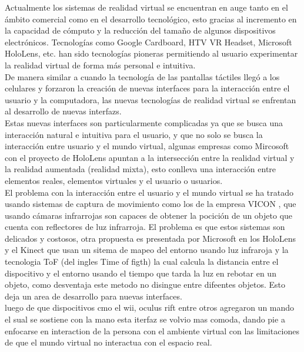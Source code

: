 Actualmente los sistemas de \gls{realidad virtual} se encuentran en auge tanto en el ámbito comercial como en el desarrollo tecnológico, esto gracias al incremento en la capacidad de cómputo y la reducción del tamaño de algunos dispositivos electrónicos. Tecnologías como Google Cardboard, HTV VR Headset, Microsoft HoloLens, etc. han sido tecnologías pioneras permitiendo al usuario experimentar la realidad virtual de forma más personal e intuitiva.\\

De manera similar a cuando la tecnología de las pantallas táctiles llegó a los celulares y forzaron la creación de nuevas interfaces para la interacción entre el usuario y la computadora, las nuevas tecnologías de realidad virtual se enfrentan al desarrollo de nuevas \glspl{interfaz}.\\

Estas nuevas interfaces son particularmente complicadas ya que se busca una interacción natural e intuitiva para el usuario, y que no solo se busca la interacción entre usuario y el mundo virtual, algunas empresas como Mircosoft con el proyecto de HoloLens apuntan a la intersección entre la realidad virtual y la realidad aumentada (realidad mixta), esto conlleva una interacción entre elementos reales, elementos virtuales y el usuario o usuarios.\\

El problema con la interacción entre el usuario y el mundo virtual se ha tratado usando sistemas de captura de movimiento como los de la empresa VICON \cite{vicon}, que usando cámaras infrarrojas son capaces de obtener la pocición de un objeto que cuenta con reflectores de luz infrarroja. El problema es que estos sistemas son delicados y costosos, otra propuesta es presentada por Microsoft en los HoloLens y el Kinect que usan un sitema de mapeo del entorno usando luz infraroja y la tecnologia ToF (del ingles Time of figth) la cual calcula la distancia entre el dispocitivo y el entorno usando el tiempo que tarda la luz en rebotar en un objeto, como desventaja este metodo no disingue entre difeentes objetos. Esto deja un area de desarrollo para nuevas interfaces.\\

luego de que dispocitivos cmo el wii, oculus rift entre otros agregaron un mando el sual se sostiene con la mano esta iterfaz se volvio mas comoda, dando pie a enfocarse en interaction de la persona con el ambiente virtual con las limitaciones de que el mundo virtual no interactua con el espacio real.

